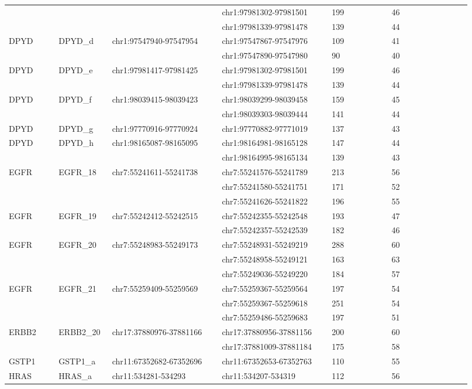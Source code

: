 \begin{landscape}
\begin{longtable}{p{0.1\linewidth}|p{0.1\linewidth}p{0.22\linewidth}p{0.22\linewidth}p{0.12\linewidth}p{0.16\linewidth}}
\\
 & & & chr1:97981302-97981501 & 199 & 46
\\
 & & & chr1:97981339-97981478 & 139 & 44
\\
DPYD & DPYD\_d & chr1:97547940-97547954 & chr1:97547867-97547976 & 109 & 41
\\
 & & & chr1:97547890-97547980 & 90 & 40
\\
DPYD & DPYD\_e & chr1:97981417-97981425 & chr1:97981302-97981501 & 199 & 46
\\
 & & & chr1:97981339-97981478 & 139 & 44
\\
DPYD & DPYD\_f & chr1:98039415-98039423 & chr1:98039299-98039458 & 159 & 45
\\
 & & & chr1:98039303-98039444 & 141 & 44
\\
DPYD & DPYD\_g & chr1:97770916-97770924 & chr1:97770882-97771019 & 137 & 43
\\
DPYD & DPYD\_h & chr1:98165087-98165095 & chr1:98164981-98165128 & 147 & 44
\\
 & & & chr1:98164995-98165134 & 139 & 43
\\
\hline
EGFR & EGFR\_18 & chr7:55241611-55241738 & chr7:55241576-55241789 & 213 & 56
\\
 & & & chr7:55241580-55241751 & 171 & 52
\\
 & & & chr7:55241626-55241822 & 196 & 55
\\
EGFR & EGFR\_19 & chr7:55242412-55242515 & chr7:55242355-55242548 & 193 & 47
\\
 & & & chr7:55242357-55242539 & 182 & 46
\\
EGFR & EGFR\_20 & chr7:55248983-55249173 & chr7:55248931-55249219 & 288 & 60
\\
 & & & chr7:55248958-55249121 & 163 & 63
\\
 & & & chr7:55249036-55249220 & 184 & 57
\\
EGFR & EGFR\_21 & chr7:55259409-55259569 & chr7:55259367-55259564 & 197 & 54
\\
 & & & chr7:55259367-55259618 & 251 & 54
\\
 & & & chr7:55259486-55259683 & 197 & 51
\\
\hline
ERBB2 & ERBB2\_20 & chr17:37880976-37881166 & chr17:37880956-37881156 & 200 & 60
\\
 & & & chr17:37881009-37881184 & 175 & 58
\\
\hline
GSTP1 & GSTP1\_a & chr11:67352682-67352696 & chr11:67352653-67352763 & 110 & 55
\\
\hline
HRAS & HRAS\_a & chr11:534281-534293 & chr11:534207-534319 & 112 & 56

\end{longtable}
\end{landscape}
